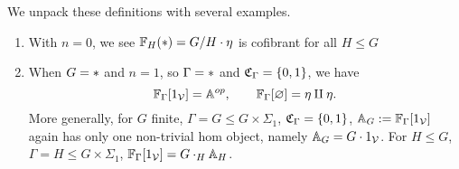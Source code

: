 \documentclass[a4paper,10pt
,draft
]{article}%
\renewcommand{\1}{\eta}%
\begin{document}
\begin{example}
      We unpack these definitions with several examples.
      \begin{enumerate}[label = (\roman*)]
      \item With $n = 0$, we see $\mathbb F_H(\**) = G/H \cdot \eta$ is cofibrant for all $H \leq G$
      \item When $G = \**$ and $n=1$, so $\Gamma = \**$ and $\mathfrak C_\Gamma = \left\{0,1\right\}$, we have
            \[
                  \mathbb F_{\Gamma}[1_{\mathcal V}] = \mathbb A^{op}, \qquad \mathbb F_{\Gamma}[\varnothing] = \eta \amalg \eta.
            \]
            More generally, for $G$ finite, $\Gamma = G \leq G \times \Sigma_1$, $\mathfrak C_\Gamma = \left\{0,1\right\}$,
            $\mathbb A_G := \mathbb F_{\Gamma}[1_{\mathcal V}]$ again has only one non-trivial hom object, namely
            $\mathbb A_G = G \cdot 1_{\mathcal V}$.
            For $H \leq G$, $\Gamma = H \leq G \times \Sigma_1$, $\mathbb F_{\Gamma}[1_{\mathcal V}] = G \cdot_H \mathbb A_H$.
            

\end{enumerate}
\end{example}
\end{document}

